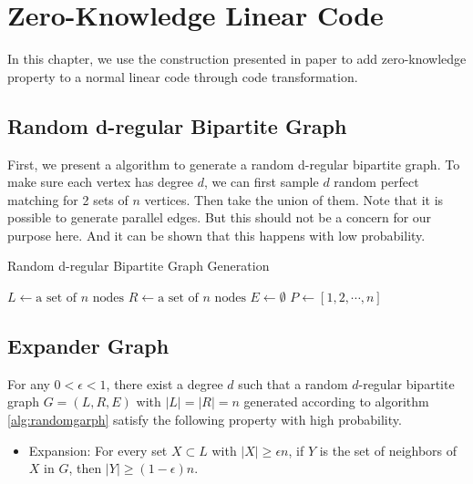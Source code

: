 \chapter{Zero-Knowledge Linear Code}

In this chapter, we use the construction presented in paper \cite{10.1145/2554797.2554815} to add zero-knowledge property to a normal linear code through code transformation. 

\section{Random d-regular Bipartite Graph}
\label{sec:randomgraph}
First, we present a algorithm to generate a random d-regular bipartite graph. To make sure each vertex has degree $d$, we can first sample $d$ random perfect matching for 2 sets of $n$ vertices. Then take the union of them. Note that it is possible to generate parallel edges. But this should not be a concern for our purpose here. And it can be shown that this happens with low probability.

{}
\begin{algorithm}[hbt!]
\caption{Random d-regular Bipartite Graph Generation}
\label{alg:randomgarph}

$L \gets \text{a set of } n \text{ nodes}$\;
$R \gets \text{a set of } n \text{ nodes}$\;
$E \gets \emptyset$\;
$P \gets [1, 2, \cdots , n]$\;
\end{algorithm}


\section{Expander Graph}

\begin{lemma}
\label{lemma:randomgraph}

For any $0 < \epsilon < 1$, there exist a degree $d$ such that a random $d$-regular bipartite graph $G=(L, R, E)$ with $|L| = |R| = n$ generated according to algorithm \ref{alg:randomgarph} satisfy the following property with high probability.

    \begin{itemize}
        \item Expansion: For every set $X \subset L$ with $|X| \ge \epsilon n$, if $Y$ is the set of neighbors of $X$ in $G$, then $|Y| \ge (1 - \epsilon)  n$.
    \end{itemize}

\end{lemma}

